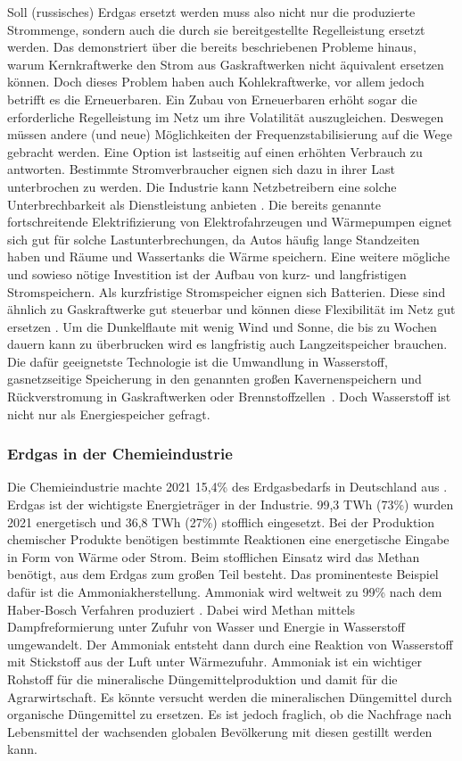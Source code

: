 Soll (russisches) Erdgas ersetzt werden muss also nicht nur die produzierte Strommenge, sondern auch die durch sie bereitgestellte Regelleistung ersetzt werden. Das demonstriert über die bereits beschriebenen Probleme hinaus, warum Kernkraftwerke den Strom aus Gaskraftwerken nicht äquivalent ersetzen können.
Doch dieses Problem haben auch Kohlekraftwerke, vor allem jedoch betrifft es die Erneuerbaren. Ein Zubau von Erneuerbaren erhöht sogar die erforderliche Regelleistung im Netz um ihre Volatilität auszugleichen. Deswegen müssen andere (und neue) Möglichkeiten der Frequenzstabilisierung auf die Wege gebracht werden. 
Eine Option ist lastseitig auf einen erhöhten Verbrauch zu antworten. Bestimmte Stromverbraucher eignen sich dazu in ihrer Last unterbrochen zu werden. Die Industrie kann Netzbetreibern eine solche Unterbrechbarkeit als Dienstleistung anbieten \cite{ei1}. Die bereits genannte fortschreitende Elektrifizierung von Elektrofahrzeugen und Wärmepumpen eignet sich gut für solche Lastunterbrechungen, da Autos häufig lange Standzeiten haben und Räume und Wassertanks die Wärme speichern. Eine weitere mögliche und sowieso nötige Investition ist der Aufbau von kurz- und langfristigen Stromspeichern. Als kurzfristige Stromspeicher eignen sich Batterien. Diese sind ähnlich zu Gaskraftwerke gut steuerbar und können diese Flexibilität im Netz gut ersetzen \cite{clausen2022}. Um die Dunkelflaute mit wenig Wind und Sonne, die bis zu Wochen dauern kann zu überbrucken wird es langfristig auch Langzeitspeicher brauchen. Die dafür geeignetste Technologie ist die Umwandlung in Wasserstoff, gasnetzseitige Speicherung in den genannten großen Kavernenspeichern und Rückverstromung in Gaskraftwerken oder Brennstoffzellen~\cite{leo}. Doch Wasserstoff ist nicht nur als Energiespeicher gefragt.

\subsubsection{Erdgas in der Chemieindustrie}

Die Chemieindustrie machte 2021 15,4\% des Erdgasbedarfs in Deutschland aus \cite{vci2022}. Erdgas ist der wichtigste Energieträger in der Industrie. 99,3 TWh (73\%) wurden 2021 energetisch und 36,8 TWh (27\%) stofflich eingesetzt. Bei der Produktion chemischer Produkte benötigen bestimmte Reaktionen eine energetische Eingabe in Form von Wärme oder Strom. Beim stofflichen Einsatz wird das Methan benötigt, aus dem Erdgas zum großen Teil besteht. Das prominenteste Beispiel dafür ist die Ammoniakherstellung. Ammoniak wird weltweit zu 99\% nach dem Haber-Bosch Verfahren produziert \cite{smil}. Dabei wird Methan mittels Dampfreformierung unter Zufuhr von Wasser und Energie in Wasserstoff umgewandelt. Der Ammoniak entsteht dann durch eine Reaktion von Wasserstoff mit Stickstoff aus der Luft unter Wärmezufuhr. Ammoniak ist ein wichtiger Rohstoff für die mineralische Düngemittelproduktion und damit für die Agrarwirtschaft. Es könnte versucht werden die mineralischen Düngemittel durch organische Düngemittel zu ersetzen. Es ist jedoch fraglich, ob die Nachfrage nach Lebensmittel der wachsenden globalen Bevölkerung mit diesen gestillt werden kann.

